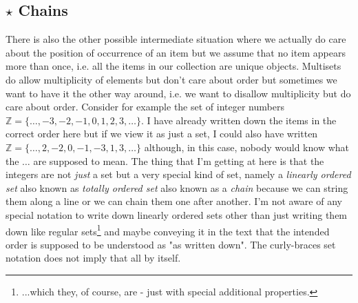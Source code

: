 

\subsection{$\star$ Chains}
There is also the other possible intermediate situation where we actually do care about the position of occurrence of an item but we assume that no item appears more than once, i.e. all the items in our collection are unique objects. Multisets do allow multiplicity of elements but don't care about order but sometimes we want to have it the other way around, i.e. we want to disallow multiplicity but do care about order. Consider for example the set of integer numbers $\mathbb{Z} = \{ \ldots,-3,-2,-1,0,1,2,3,\ldots \}$. I have already written down the items in the correct order here but if we view it as just a set, I could also have written $\mathbb{Z} = \{ \ldots,2,-2,0,-1,-3,1,3,\ldots \}$ although, in this case, nobody would know what the $\ldots$ are supposed to mean. The thing that I'm getting at here is that the integers are not \emph{just} a set but a very special kind of set, namely a \emph{linearly ordered set} also known as \emph{totally ordered set} also known as a \emph{chain} because we can string them along a line or we can chain them one after another. I'm not aware of any special notation to write down linearly ordered sets other than just writing them down like regular sets\footnote{...which they, of course, are - just with special additional properties.} and maybe conveying it in the text that the intended order is supposed to be understood as "as written down". The curly-braces set notation does not imply that all by itself. %


